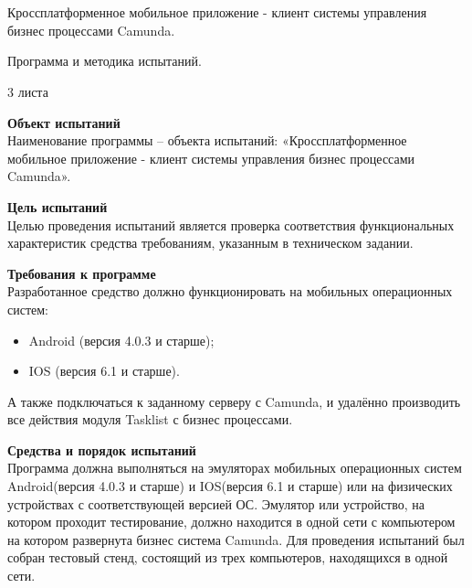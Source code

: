 \newpage

\chapter{}

\vspace{7em}

\begin{center}
	Кроссплатформенное мобильное приложение - клиент системы управления бизнес процессами Camunda.
\end{center}

\begin{center}
	Программа и методика испытаний.
\end{center}
\begin{center}
	3 листа
\end{center}
\newpage
\textbf{Объект испытаний}\\
Наименование программы – объекта испытаний:  «Кроссплатформенное мобильное приложение - клиент системы управления бизнес процессами Camunda».

\textbf{Цель испытаний}\\
Целью проведения испытаний является проверка соответствия функциональных характеристик средства требованиям, указанным в техническом задании.

\textbf{Требования к программе}\\
Разработанное средство должно функционировать на мобильных операционных систем:
\begin{itemize}
	\item Android (версия 4.0.3 и старше);
	\item IOS (версия 6.1 и старше).
\end{itemize} 
А также подключаться к заданному серверу с Camunda, и удалённо производить все действия модуля Tasklist с бизнес процессами.

\textbf{Средства и порядок испытаний}\\
Программа должна выполняться на эмуляторах мобильных операционных систем Android(версия 4.0.3 и старше) и IOS(версия 6.1 и старше) или на физических устройствах с соответствующей версией ОС. Эмулятор или устройство, на котором проходит тестирование, должно находится в одной сети с компьютером на котором развернута бизнес система Camunda. Для проведения испытаний был собран тестовый стенд, состоящий из трех компьютеров, находящихся в одной сети.

